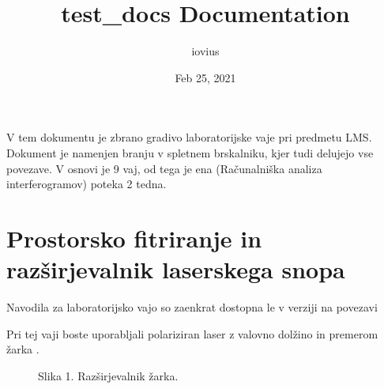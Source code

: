 \documentclass[letterpaper,10pt,english]{sphinxmanual}
\title{test\_docs Documentation}
\date{Feb 25, 2021}
\author{iovius}
\begin{document}
\pagestyle{empty}
\sphinxmaketitle
\pagestyle{plain}
\sphinxtableofcontents
\pagestyle{normal}
\label{\detokenize{index::doc}}


\sphinxAtStartPar
V tem dokumentu je zbrano gradivo laboratorijske vaje pri predmetu LMS. Dokument je namenjen branju v spletnem brskalniku, kjer tudi delujejo vse povezave. V osnovi je 9 vaj, od tega je ena (Računalniška analiza interferogramov) poteka 2 tedna.


\chapter{Prostorsko fitriranje in razširjevalnik laserskega snopa}
\label{\detokenize{prostorskofiltriranje:prostorsko-fitriranje-in-razsirjevalnik-laserskega-snopa}}\label{\detokenize{prostorskofiltriranje:prostorskofiltriranje}}\label{\detokenize{prostorskofiltriranje::doc}}
\sphinxAtStartPar
Navodila za laboratorijsko vajo so zaenkrat dostopna le v  verziji na povezavi 

\sphinxAtStartPar
Pri tej vaji boste uporabljali polariziran  laser z valovno dolžino  in premerom žarka .

\begin{figure}[htbp]
\centering
\capstart

\noindent{}
\caption{Slika 1. Razširjevalnik žarka.}\label{\detokenize{prostorskofiltriranje:id1}}\end{figure}
\end{document}
